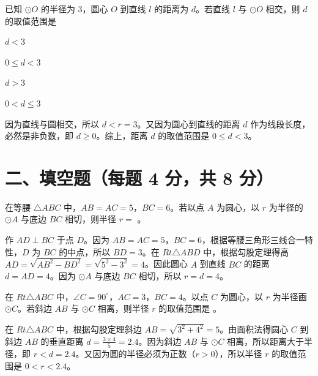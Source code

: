 \documentclass{exam-zh}
\begin{document}
\begin{question}[points=4]
  已知 $\odot O$ 的半径为 $3$，圆心 $O$ 到直线 $l$ 的距离为 $d$。若直线 $l$ 与 $\odot O$ 相交，则 $d$ 的取值范围是
  \begin{choices}
    \item $d < 3$
    \item $0 \le d < 3$
    \item $d > 3$
    \item $0 < d \le 3$
  \end{choices}
  \paren[B]
  \begin{solutionblock}
    因为直线与圆相交，所以 $d < r = 3$。又因为圆心到直线的距离 $d$ 作为线段长度，必然是非负数，即 $d \ge 0$。综上，距离 $d$ 的取值范围是 $0 \le d < 3$。
  \end{solutionblock}
\end{question}


\section*{二、填空题（每题 4 分，共 8 分）}


\begin{question}[points=4]
  在等腰 $\triangle ABC$ 中，$AB = AC = 5$，$BC = 6$。若以点 $A$ 为圆心，以 $r$ 为半径的 $\odot A$ 与底边 $BC$ 相切，则半径 $r = $ \underline{\quad\quad}。
  \paren[$4$]
  \begin{solutionblock}
    作 $AD \perp BC$ 于点 $D$。因为 $AB = AC = 5$，$BC = 6$，根据等腰三角形三线合一特性，$D$ 为 $BC$ 的中点，所以 $BD = 3$。在 $Rt\triangle ABD$ 中，根据勾股定理得高 $AD = \sqrt{AB^2 - BD^2} = \sqrt{5^2 - 3^2} = 4$。因此圆心 $A$ 到直线 $BC$ 的距离 $d = AD = 4$。因为 $\odot A$ 与底边 $BC$ 相切，所以 $r = d = 4$。
  \end{solutionblock}
\end{question}



\begin{question}[points=4]
  在 $Rt\triangle ABC$ 中，$\angle C = 90^\circ$，$AC = 3$，$BC = 4$。以点 $C$ 为圆心，以 $r$ 为半径画 $\odot C$。若斜边 $AB$ 与 $\odot C$ 相离，则半径 $r$ 的取值范围是 \underline{\quad\quad}。
  \paren[$0 < r < 2.4$]
  \begin{solutionblock}
    在 $Rt\triangle ABC$ 中，根据勾股定理斜边 $AB = \sqrt{3^2 + 4^2} = 5$。由面积法得圆心 $C$ 到斜边 $AB$ 的垂直距离 $d = \frac{3 \times 4}{5} = 2.4$。因为斜边 $AB$ 与 $\odot C$ 相离，所以距离大于半径，即 $r < d = 2.4$。又因为圆的半径必须为正数（$r > 0$），所以半径 $r$ 的取值范围是 $0 < r < 2.4$。
  \end{solutionblock}
\end{question}
\end{document}
